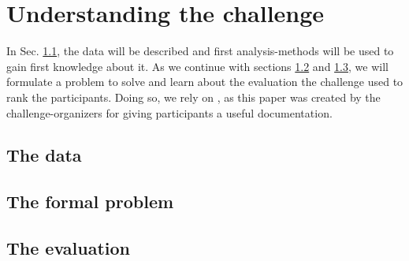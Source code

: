 \section{Understanding the challenge}\label{ch:challenge}\raggedbottom
In Sec. \ref{sec:data}, the data will be described and first analysis-methods will be used to gain first knowledge about it.
As we continue with sections \ref{sec:prob} and \ref{sec:eval}, we will formulate a problem to solve and learn about the evaluation the challenge used to rank the participants. Doing so, we rely on \cite{higgsPaper}, as this paper was created by the challenge-organizers for giving participants a useful documentation.

\subsection{The data}\label{sec:data}



\subsection{The formal problem}\label{sec:prob}



\subsection{The evaluation}\label{sec:eval}




%
\pagebreak

	{\pagebreak \thispagestyle{empty} \cleardoublepage}{\clearpage}
